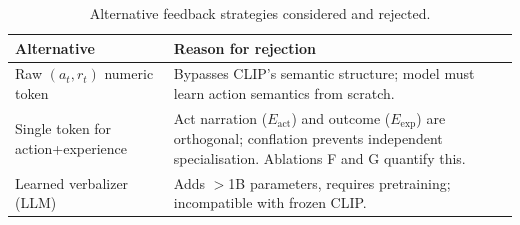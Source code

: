 \documentclass{article}
\newcommand{\Lact}{$E_{\mathrm{act}}$\xspace}
\newcommand{\Lexp}{$E_{\mathrm{exp}}$\xspace}
\begin{document}
\begin{table}[h]
\centering
\small
\begin{tabular}{L{4cm}L{8.5cm}}
\toprule
\textbf{Alternative} & \textbf{Reason for rejection} \\
\midrule
Raw $(a_t,r_t)$ numeric token &
  Bypasses CLIP's semantic structure; model must learn action semantics from scratch. \\
Single token for action+experience &
  Act narration (\Lact) and outcome (\Lexp) are orthogonal; conflation prevents
  independent specialisation. Ablations F and G quantify this. \\
Learned verbalizer (LLM) &
  Adds $>$1B parameters, requires pretraining; incompatible with frozen CLIP. \\
\bottomrule
\end{tabular}
\caption{Alternative feedback strategies considered and rejected.}
\label{tab:alternatives}
\end{table}
\end{document}
